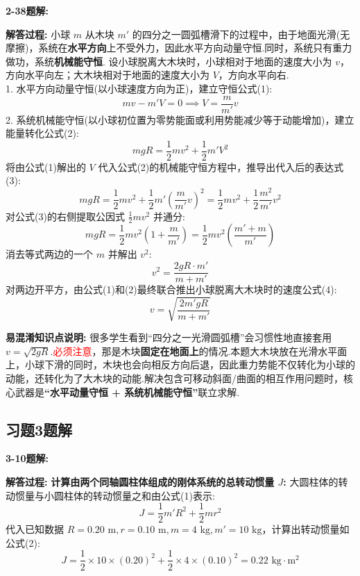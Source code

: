 \vspace{2em}

\textbf{2-38题解:}


\textbf{解答过程:}
小球 $m$ 从木块 $m'$ 的四分之一圆弧槽滑下的过程中，由于地面光滑(无摩擦)，系统在\textbf{水平方向}上不受外力，因此水平方向动量守恒.同时，系统只有重力做功，系统\textbf{机械能守恒}.
设小球脱离大木块时，小球相对于地面的速度大小为 $v$，方向水平向左；大木块相对于地面的速度大小为 $V$，方向水平向右.\\
1. 水平方向动量守恒(以小球速度方向为正)，建立守恒公式(1):
\begin{equation}
	mv - m'V = 0 \implies V = \frac{m}{m'}v
\end{equation}
2. 系统机械能守恒(以小球初位置为零势能面或利用势能减少等于动能增加)，建立能量转化公式(2):
\begin{equation}
	mgR = \frac{1}{2}mv^2 + \frac{1}{2}m'V^2
\end{equation}
将由公式(1)解出的 $V$ 代入公式(2)的机械能守恒方程中，推导出代入后的表达式(3):
\begin{equation}
	mgR = \frac{1}{2}mv^2 + \frac{1}{2}m'\left(\frac{m}{m'}v\right)^2 = \frac{1}{2}mv^2 + \frac{1}{2}\frac{m^2}{m'}v^2
\end{equation}
对公式(3)的右侧提取公因式 $\frac{1}{2}mv^2$ 并通分:
$$mgR = \frac{1}{2}mv^2 \left(1 + \frac{m}{m'}\right) = \frac{1}{2}mv^2 \left(\frac{m' + m}{m'}\right)$$
消去等式两边的一个 $m$ 并解出 $v^2$:
$$v^2 = \frac{2gR \cdot m'}{m + m'}$$
对两边开平方，由公式(1)和(2)最终联合推出小球脱离大木块时的速度公式(4):
\begin{equation}
	v = \sqrt{\frac{2m'gR}{m + m'}}
\end{equation}

\textbf{易混淆知识点说明:}
很多学生看到“四分之一光滑圆弧槽”会习惯性地直接套用 $v = \sqrt{2gR}$.\textcolor{red}{必须注意}，那是木块\textbf{固定在地面上}的情况.本题大木块放在光滑水平面上，小球下滑的同时，木块也会向相反方向后退，因此重力势能不仅转化为小球的动能，还转化为了大木块的动能.解决包含可移动斜面/曲面的相互作用问题时，核心武器是\textbf{“水平动量守恒 + 系统机械能守恒”}联立求解.
\newpage

\subsection{习题3题解}

\textbf{3-10题解:}


\textbf{解答过程:}
\textbf{计算由两个同轴圆柱体组成的刚体系统的总转动惯量 $J$:}
大圆柱体的转动惯量与小圆柱体的转动惯量之和由公式(1)表示:
\begin{equation}
	J = \frac{1}{2}m'R^2 + \frac{1}{2}mr^2
\end{equation}
代入已知数据 $R = 0.20 \text{ m}, r = 0.10 \text{ m}, m = 4 \text{ kg}, m' = 10 \text{ kg}$，计算出转动惯量如公式(2):
\begin{equation}
	J = \frac{1}{2} \times 10 \times (0.20)^2 + \frac{1}{2} \times 4 \times (0.10)^2 = 0.22 \text{ kg}\cdot\text{m}^2
\end{equation}

